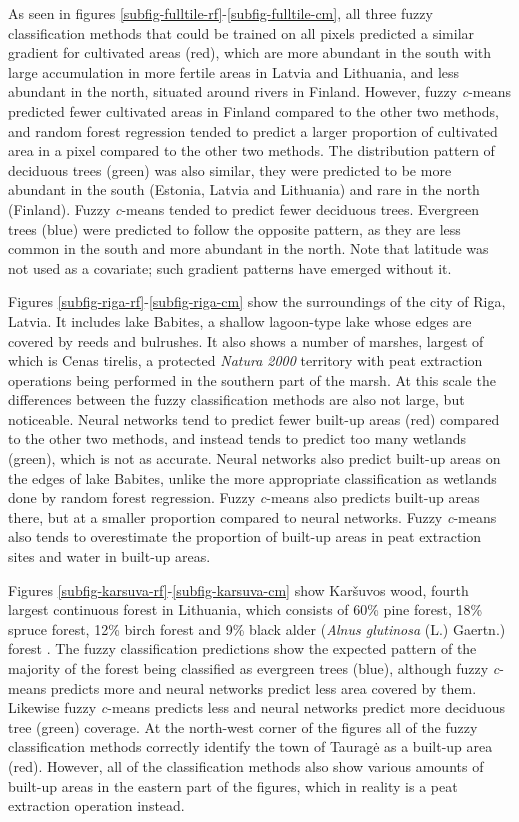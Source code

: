 \documentclass[a4paper,12pt]{scrbook}
\begin{document}
As seen in figures \ref{subfig-fulltile-rf}-\ref{subfig-fulltile-cm}, all three fuzzy classification methods that could be trained on all pixels predicted a similar gradient for cultivated areas (red), which are more abundant in the south with large accumulation in more fertile areas in Latvia and Lithuania, and less abundant in the north, situated around rivers in Finland. However, fuzzy \textit{c}-means predicted fewer cultivated areas in Finland compared to the other two methods, and random forest regression tended to predict a larger proportion of cultivated area in a pixel compared to the other two methods. The distribution pattern of deciduous trees (green) was also similar, they were predicted to be more abundant in the south (Estonia, Latvia and Lithuania) and rare in the north (Finland). Fuzzy \textit{c}-means tended to predict fewer deciduous trees. Evergreen trees (blue) were predicted to follow the opposite pattern, as they are less common in the south and more abundant in the north. Note that latitude was not used as a covariate; such gradient patterns have emerged without it.

Figures \ref{subfig-riga-rf}-\ref{subfig-riga-cm} show the surroundings of the city of Riga, Latvia. It includes lake Babites, a shallow lagoon-type lake whose edges are covered by reeds and bulrushes. It also shows a number of marshes, largest of which is Cenas tirelis, a protected \textit{Natura 2000} territory with peat extraction operations being performed in the southern part of the marsh. At this scale the differences between the fuzzy classification methods are also not large, but noticeable. Neural networks tend to predict fewer built-up areas (red) compared to the other two methods, and instead tends to predict too many wetlands (green), which is not as accurate. Neural networks also predict built-up areas on the edges of lake Babites, unlike the more appropriate classification as wetlands done by random forest regression. Fuzzy \textit{c}-means also predicts built-up areas there, but at a smaller proportion compared to neural networks. Fuzzy \textit{c}-means also tends to overestimate the proportion of built-up areas in peat extraction sites and water in built-up areas.

Figures \ref{subfig-karsuva-rf}-\ref{subfig-karsuva-cm} show Kar\v{s}uvos wood, fourth largest continuous forest in Lithuania, which consists of 60\% pine forest, 18\% spruce forest, 12\% birch forest and 9\% black alder (\textit{Alnus glutinosa} (L.) Gaertn.) forest \citep{lietuviuenciklopedija2006}. The fuzzy classification predictions show the expected pattern of the majority of the forest being classified as evergreen trees (blue), although fuzzy \textit{c}-means predicts more and neural networks predict less area covered by them. Likewise fuzzy \textit{c}-means predicts less and neural networks predict more deciduous tree (green) coverage. At the north-west corner of the figures all of the fuzzy classification methods correctly identify the town of Taurag\.{e} as a built-up area (red). However, all of the classification methods also show various amounts of built-up areas in the eastern part of the figures, which in reality is a peat extraction operation instead.
\end{document}

